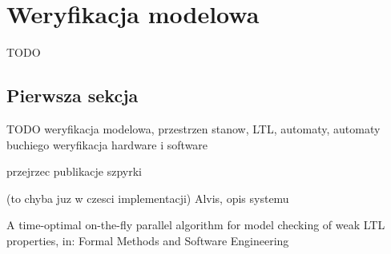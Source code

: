 \chapter{Weryfikacja modelowa}

TODO


\section{Pierwsza sekcja}

TODO
weryfikacja modelowa, przestrzen stanow, LTL, automaty, automaty buchiego
weryfikacja hardware i software

\cite{Bar12} \cite{Jac05}
przejrzec publikacje szpyrki


(to chyba juz w czesci implementacji)
Alvis, opis systemu


A time-optimal on-the-fly parallel algorithm for model checking of weak LTL properties, in: Formal Methods and Software Engineering